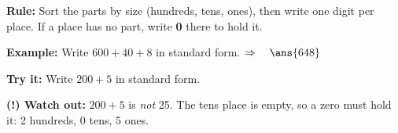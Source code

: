 \documentclass[12pt]{article}
\begin{document}

\begin{formulabox}
\textbf{Rule:} Sort the parts by size (hundreds, tens, ones), then write one
digit per place. If a place has no part, write \textbf{0} there to hold it.
\end{formulabox}

\begin{examplebox}
\textbf{Example:} \quad Write $600 + 40 + 8$ in standard form.
$\Rightarrow\quad \ans{648}$
\end{examplebox}

\begin{tryitbox}
\textbf{Try it:} \quad Write $200 + 5$ in standard form.\\[2pt]
\end{tryitbox}

\begin{watchoutbox}
\textbf{(!) Watch out:} $200 + 5$ is \emph{not} 25. The tens place is empty,
so a zero must hold it: 2 hundreds, 0 tens, 5 ones.
\end{watchoutbox}
\end{document}
